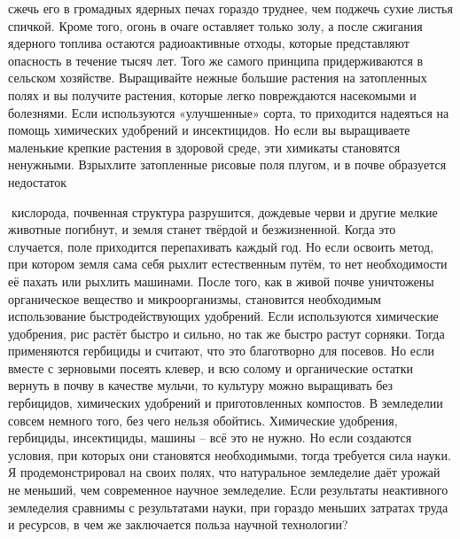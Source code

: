\documentclass[a4paper]{book}
\begin{document}
сжечь его в громадных ядерных печах гораздо труднее, чем поджечь сухие листья спичкой.
Кроме того, огонь в очаге оставляет только золу, а после сжигания ядерного топлива
остаются радиоактивные отходы, которые представляют опасность в течение тысяч лет.
Того же самого принципа придерживаются в сельском хозяйстве. Выращивайте нежные
большие растения на затопленных полях и вы получите растения, которые легко
повреждаются насекомыми и болезнями. Если используются «улучшенные» сорта, то
приходится надеяться на помощь химических удобрений и инсектицидов.
Но если вы выращиваете маленькие крепкие растения в здоровой среде, эти химикаты
становятся ненужными.
Взрыхлите затопленные рисовые поля плугом, и в почве образуется недостаток

кислорода, почвенная структура разрушится, дождевые черви и другие мелкие животные
погибнут, и земля станет твёрдой и безжизненной. Когда это случается, поле приходится
перепахивать каждый год.
Но если освоить метод, при котором земля сама себя рыхлит естественным путём, то
нет необходимости её пахать или рыхлить машинами. После того, как в живой почве
уничтожены органическое вещество и микроорганизмы, становится необходимым
использование быстродействующих удобрений. Если используются химические удобрения,
рис растёт быстро и сильно, но так же быстро растут сорняки. Тогда применяются
гербициды и считают, что это благотворно для посевов.
Но если вместе с зерновыми посеять клевер, и всю солому и органические остатки
вернуть в почву в качестве мульчи, то культуру можно выращивать без гербицидов,
химических удобрений и приготовленных компостов.
В земледелии совсем немного того, без чего нельзя обойтись. Химические удобрения,
гербициды, инсектициды, машины – всё это не нужно. Но если создаются условия, при
которых они становятся необходимыми, тогда требуется сила науки.
Я продемонстрировал на своих полях, что натуральное земледелие даёт урожай не
меньший, чем современное научное земледелие. Если результаты неактивного земледелия
сравнимы с результатами науки, при гораздо меньших затратах труда и ресурсов, в чем же
заключается польза научной технологии?
\end{document}
